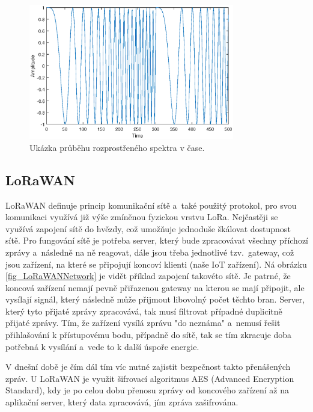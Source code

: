 \begin{figure}
    \centering
    \includegraphics[width=0.8\textwidth]{obrazky/ChirpSpreadSpectrum.eps}
    \caption{Ukázka průběhu rozprostřeného spektra v čase.}
    \label{fig_chirpSpreadSpectrum}
\end{figure}

\subsection{LoRaWAN}

LoRaWAN definuje princip komunikační sítě a~také použitý protokol, pro svou komunikaci využívá již výše zmíněnou fyzickou vrstvu LoRa. Nejčastěji se využívá zapojení sítě do hvězdy, což umožňuje jednoduše škálovat dostupnost sítě. Pro fungování sítě je potřeba server, který bude zpracovávat všechny příchozí zprávy a~následně na ně reagovat, dále jsou třeba jednotlivé tzv.~gateway, což jsou zařízení, na které se připojují koncoví klienti (naše IoT zařízení). Ná obrázku \ref{fig_LoRaWANNetwork} je vidět příklad zapojení takovéto sítě. Je patrné, že koncová zařízení nemají pevně přiřazenou gateway na kterou se mají připojit, ale vysílají signál, který následně může přijmout libovolný počet těchto bran. Server, který tyto přijaté zprávy zpracovává, tak musí filtrovat případné duplicitně přijaté zprávy. Tím, že zařízení vysílá zprávu "do neznáma"{} a~nemusí řešit přihlašování k přístupovému bodu, případně do sítě, tak se tím zkracuje doba potřebná k vysílání a~vede to k další úspoře energie.

V dnešní době je čím dál tím víc nutné zajistit bezpečnost takto přenášených zpráv. U LoRaWAN je využit šifrovací algoritmus AES (Advanced Encryption Standard), kdy je po celou dobu přenosu zprávy od koncového zařízení až na aplikační server, který data zpracovává, jím zpráva zašifrována.


